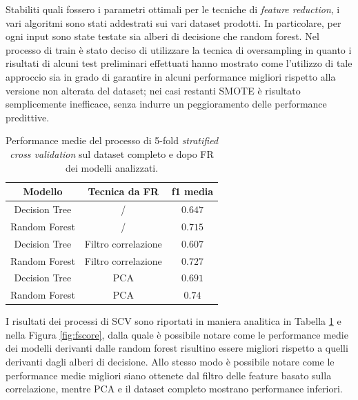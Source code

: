 Stabiliti quali fossero i parametri ottimali per le tecniche di \textit{feature reduction}, i vari algoritmi sono stati addestrati sui vari dataset prodotti. In particolare, per ogni input sono state testate sia alberi di decisione che random forest. Nel processo di train è stato deciso di utilizzare la tecnica di oversampling in quanto i risultati di alcuni test preliminari effettuati hanno mostrato come l'utilizzo di tale approccio sia in grado di garantire in alcuni performance migliori rispetto alla versione non alterata del dataset; nei casi restanti SMOTE è risultato semplicemente inefficace, senza indurre un peggioramento delle performance predittive.
\begin{table}
	\centering
	\caption{Performance medie del processo di 5-fold \textit{stratified cross validation} sul dataset completo e dopo FR dei modelli analizzati.}
	\label{tab:f1score}
	\begin{tabular}{|c|c|c|}
		\toprule
		Modello & Tecnica da FR & f1 media \\ 
		\midrule 
		Decision Tree & / & $0.647$ \\
		Random Forest & / & $0.715$ \\ 
		Decision Tree & Filtro correlazione & $0.607$ \\ 
		Random Forest & Filtro correlazione & $0.727$ \\ 
		Decision Tree & PCA & $0.691$ \\ 
		Random Forest & PCA & $0.74$ \\ 
		\bottomrule
	\end{tabular}
\end{table}
I risultati dei processi di SCV sono riportati in maniera analitica in Tabella \ref{tab:f1score} e nella Figura \ref{fig:fscore}, dalla quale è possibile notare come le performance medie dei modelli derivanti dalle random forest risultino essere migliori rispetto a quelli derivanti dagli alberi di decisione. Allo stesso modo è possibile notare come le performance medie migliori siano ottenete dal filtro delle feature basato sulla correlazione, mentre PCA e il dataset completo mostrano performance inferiori. 
